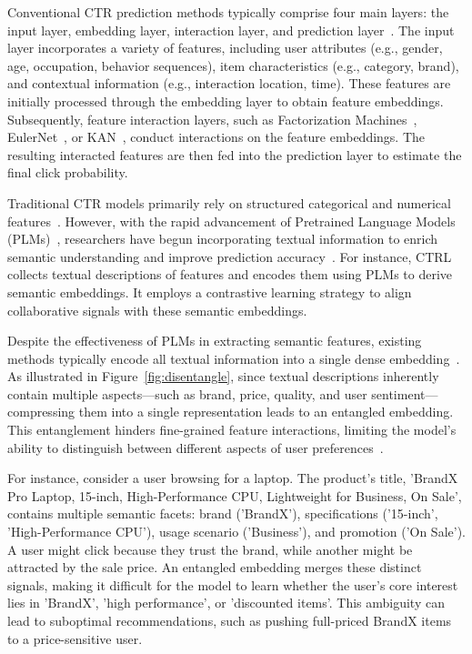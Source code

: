 Conventional CTR prediction methods typically comprise four main layers: the input layer, embedding layer, interaction layer, and prediction layer~\cite{guo2017deepfm, wang2021dcn}. The input layer incorporates a variety of features, including user attributes (e.g., gender, age, occupation, behavior sequences), item characteristics (e.g., category, brand), and contextual information (e.g., interaction location, time). These features are initially processed through the embedding layer to obtain feature embeddings. Subsequently, feature interaction layers, such as Factorization Machines~\cite{rendle2010factorization}, EulerNet~\cite{tian2023eulernet}, or KAN~\cite{shi2024beyond}, conduct interactions on the feature embeddings. The resulting interacted features are then fed into the prediction layer to estimate the final click probability.

Traditional CTR models primarily rely on structured categorical and numerical features~\cite{guo2021dual, liu2020autofis}. However, with the rapid advancement of Pretrained Language Models (PLMs)~\cite{devlin2019bert}, researchers have begun incorporating textual information to enrich semantic understanding and improve prediction accuracy~\cite{wang2023bert4ctr, chen2023tbin}. For instance, CTRL~\cite{li2023ctrl} collects textual descriptions of features and encodes them using PLMs to derive semantic embeddings. It employs a contrastive learning strategy to align collaborative signals with these semantic embeddings. 

Despite the effectiveness of PLMs in extracting semantic features, existing methods typically encode all textual information into a single dense embedding~\cite{liu2020category, yang2019learning}. As illustrated in Figure~\ref{fig:disentangle}, since textual descriptions inherently contain multiple aspects—such as brand, price, quality, and user sentiment—compressing them into a single representation leads to an entangled embedding. This entanglement hinders fine-grained feature interactions, limiting the model's ability to distinguish between different aspects of user preferences~\cite{ma2019learning, wang2020disentangled}.

For instance, consider a user browsing for a laptop. The product's title, 'BrandX Pro Laptop, 15-inch, High-Performance CPU, Lightweight for Business, On Sale', contains multiple semantic facets: brand ('BrandX'), specifications ('15-inch', 'High-Performance CPU'), usage scenario ('Business'), and promotion ('On Sale'). A user might click because they trust the brand, while another might be attracted by the sale price. An entangled embedding merges these distinct signals, making it difficult for the model to learn whether the user's core interest lies in 'BrandX', 'high performance', or 'discounted items'. This ambiguity can lead to suboptimal recommendations, such as pushing full-priced BrandX items to a price-sensitive user.

